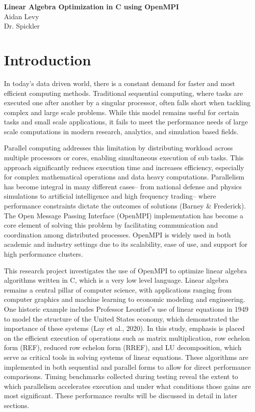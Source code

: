 \documentclass[12pt]{article}
\begin{document}
\begin{center}
    \LARGE \textbf{Linear Algebra Optimization in C using OpenMPI} \\
    \vspace{0.3cm}
    \large Aidan Levy \\
    Dr. Spickler \\
    \date{\today}
\end{center}

\newpage

\section{Introduction}
In today’s data driven world, there is a constant demand for faster and most efficient computing methods. Traditional sequential computing, where tasks are executed one after another by a singular processor, often falls short when tackling complex and large scale problems. While this model remains useful for certain tasks and small scale applications, it fails to meet the performance needs of large scale computations in modern research, analytics, and simulation based fields. 

Parallel computing addresses this limitation by distributing workload across multiple processors or cores, enabling simultaneous execution of sub tasks. This approach significantly reduces execution time and increases efficiency, especially for complex mathematical operations and data heavy computations. Parallelism has become integral in many different cases-- from national defense and physics simulations to artificial intelligence and high frequency trading-- where performance constraints dictate the outcomes of solutions (Barney \& Frederick). The Open Message Passing Interface (OpenMPI) implementation has become a core element of solving this problem by facilitating communication and coordination among distributed processes. OpenMPI is widely used in both academic and industry settings due to its scalability, ease of use, and support for high performance clusters.

This research project investigates the use of OpenMPI to optimize linear algebra algorithms written in C, which is a very low level language. Linear algebra remains a central pillar of computer science, with applications ranging from computer graphics and machine learning to economic modeling and engineering. One historic example includes Professor Leontief’s use of linear equations in 1949 to model the structure of the United States economy, which demonstrated the importance of these systems (Lay et al., 2020). In this study, emphasis is placed on the efficient execution of operations such as matrix multiplication, row echelon form (REF), reduced row echelon form (RREF), and LU decomposition, which serve as critical tools in solving systems of linear equations. These algorithms are implemented in both sequential and parallel forms to allow for direct performance comparisons. Timing benchmarks collected during testing reveal the extent to which parallelism accelerates execution and under what conditions those gains are most significant. These performance results will be discussed in detail in later sections. 
\end{document}
